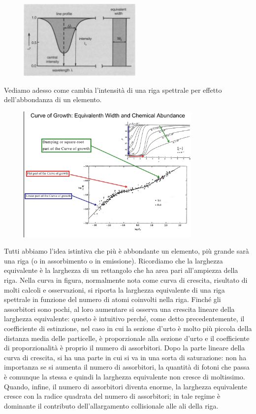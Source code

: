 \begin{figure}[H]
  \centering
  \includegraphics[width=6cm]{immagini/equivalent_width.png}
\end{figure}

Vediamo adesso come cambia l'intensità di una riga spettrale per effetto dell'abbondanza di un elemento.

\begin{figure}[H]
  \centering
  \includegraphics[width=9cm]{curva.jpg}
\end{figure}

Tutti abbiamo l'idea istintiva che più è abbondante un elemento, più grande sarà una riga (o in assorbimento o in emissione). Ricordiamo che la larghezza equivalente è la larghezza di un rettangolo che ha area pari all'ampiezza della riga. Nella curva in figura, normalmente nota come curva di crescita, risultato di molti calcoli e osservazioni, si riporta la larghezza equivalente di una riga spettrale in funzione del numero di atomi coinvolti nella riga. Finché gli assorbitori sono pochi, al loro aumentare si osserva una crescita lineare della larghezza equivalente: questo è intuitivo perché, come detto precedentemente, il coefficiente di estinzione, nel caso in cui la sezione d'urto è molto più piccola della distanza media delle particelle, è proporzionale alla sezione d'urto e il coefficiente di proporzionalità è proprio il numero di assorbitori. Dopo la parte lineare della curva di crescita, si ha una parte in cui si va in una sorta di saturazione: non ha importanza se si aumenta il numero di assorbitori, la quantità di fotoni che passa è comunque la stessa e quindi la larghezza equivalente non cresce di moltissimo. Quando, infine, il numero di assorbitori diventa enorme, la larghezza equivalente cresce con la radice quadrata del numero di assorbitori; in tale regime è dominante il contributo dell'allargamento collisionale alle ali della riga.



